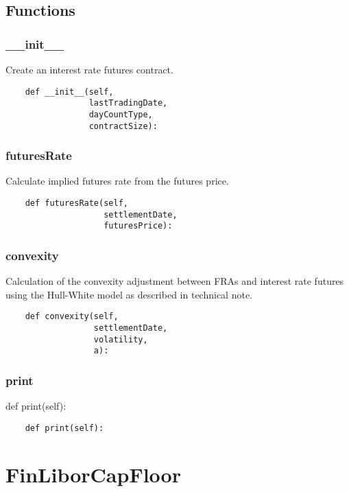 \documentclass[twoside,11pt]{book}
\begin{document}
\subsection*{Functions}

\subsubsection*{{\bf \_\_init\_\_}}
Create an interest rate futures contract. 

\begin{lstlisting}
    def __init__(self,
                 lastTradingDate,
                 dayCountType,
                 contractSize):
\end{lstlisting}

\subsubsection*{{\bf futuresRate}}
Calculate implied futures rate from the futures price. 

\begin{lstlisting}
    def futuresRate(self,
                    settlementDate,
                    futuresPrice):
\end{lstlisting}

\subsubsection*{{\bf convexity}}
Calculation of the convexity adjustment between FRAs and interest rate futures using the Hull-White model as described in technical note.  

\begin{lstlisting}
    def convexity(self,
                  settlementDate,
                  volatility,
                  a):
\end{lstlisting}

\subsubsection*{{\bf print}}
def print(self): 

\begin{lstlisting}
    def print(self):
\end{lstlisting}

\newpage
\section{FinLiborCapFloor}
\end{document}
